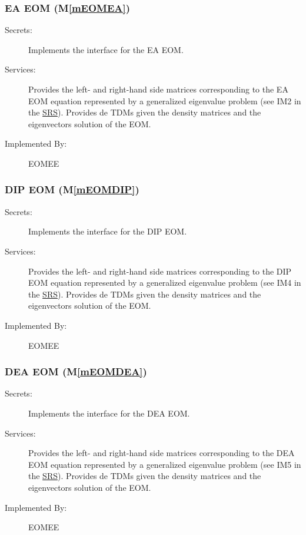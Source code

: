 \documentclass[12pt, titlepage]{article}
\newcommand{\mref}[1]{M\ref{#1}}
\begin{document}
\subsubsection{EA EOM (\mref{mEOMEA})}

\begin{description}
	\item[Secrets:] Implements the interface for the EA EOM.
	\item[Services:] Provides the left- and right-hand side matrices 
	corresponding to the EA EOM equation represented by a generalized 
	eigenvalue problem (see IM2 in the 
	\href{https://github.com/gabrielasd/eomee/tree/cas741/docs/SRS/}{SRS}). 
	Provides de TDMs given the density matrices and the 
	eigenvectors solution of the EOM.
	\item[Implemented By:] EOMEE
\end{description}

\subsubsection{DIP EOM (\mref{mEOMDIP})}

\begin{description}
	\item[Secrets:] Implements the interface for the DIP EOM.
	\item[Services:] Provides the left- and right-hand side matrices 
	corresponding to the DIP EOM equation represented by a generalized 
	eigenvalue problem (see IM4 in the 
	\href{https://github.com/gabrielasd/eomee/tree/cas741/docs/SRS/}{SRS}). 
	Provides de TDMs given the density matrices and the 
	eigenvectors solution of the EOM.
	\item[Implemented By:] EOMEE
\end{description}

\subsubsection{DEA EOM (\mref{mEOMDEA})}

\begin{description}
	\item[Secrets:] Implements the interface for the DEA EOM.
	\item[Services:] Provides the left- and right-hand side matrices 
	corresponding to the DEA EOM equation represented by a generalized 
	eigenvalue problem (see IM5 in the 
	\href{https://github.com/gabrielasd/eomee/tree/cas741/docs/SRS/}{SRS}). 
	Provides de TDMs given the density matrices and the 
	eigenvectors solution of the EOM.
	\item[Implemented By:] EOMEE
\end{description}
\end{document}
